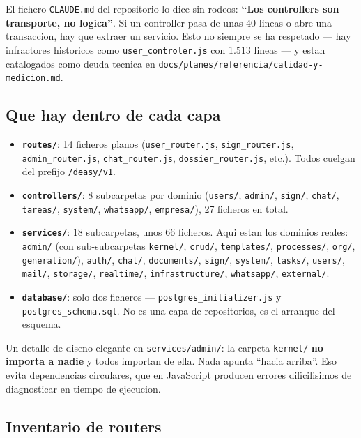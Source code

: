 \documentclass[11pt,a4paper,oneside]{report}
\newcommand{\rt}[1]{\texttt{#1}}
\begin{document}
El fichero \rt{CLAUDE.md} del repositorio lo dice sin rodeos: \textbf{``Los controllers son
transporte, no logica''}. Si un controller pasa de unas 40 lineas o abre una transaccion,
hay que extraer un servicio. Esto no siempre se ha respetado --- hay infractores historicos
como \rt{user\_controler.js} con 1.513 lineas --- y estan catalogados como deuda tecnica en
\rt{docs/planes/referencia/calidad-y-medicion.md}.

\subsection{Que hay dentro de cada capa}

\begin{itemize}[leftmargin=1.4em]
  \item \textbf{\rt{routes/}}: 14 ficheros planos (\rt{user\_router.js}, \rt{sign\_router.js},
        \rt{admin\_router.js}, \rt{chat\_router.js}, \rt{dossier\_router.js}, etc.). Todos
        cuelgan del prefijo \rt{/deasy/v1}.
  \item \textbf{\rt{controllers/}}: 8 subcarpetas por dominio (\rt{users/}, \rt{admin/},
        \rt{sign/}, \rt{chat/}, \rt{tareas/}, \rt{system/}, \rt{whatsapp/}, \rt{empresa/}),
        27 ficheros en total.
  \item \textbf{\rt{services/}}: 18 subcarpetas, unos 66 ficheros. Aqui estan los dominios
        reales: \rt{admin/} (con sub-subcarpetas \rt{kernel/}, \rt{crud/}, \rt{templates/},
        \rt{processes/}, \rt{org/}, \rt{generation/}), \rt{auth/}, \rt{chat/},
        \rt{documents/}, \rt{sign/}, \rt{system/}, \rt{tasks/}, \rt{users/}, \rt{mail/},
        \rt{storage/}, \rt{realtime/}, \rt{infrastructure/}, \rt{whatsapp/}, \rt{external/}.
  \item \textbf{\rt{database/}}: solo dos ficheros --- \rt{postgres\_initializer.js} y
        \rt{postgres\_schema.sql}. No es una capa de repositorios, es el arranque del esquema.
\end{itemize}

Un detalle de diseno elegante en \rt{services/admin/}: la carpeta \rt{kernel/} \textbf{no
importa a nadie} y todos importan de ella. Nada apunta ``hacia arriba''. Eso evita
dependencias circulares, que en JavaScript producen errores dificilisimos de diagnosticar en
tiempo de ejecucion.

\subsection{Inventario de routers}
\end{document}
